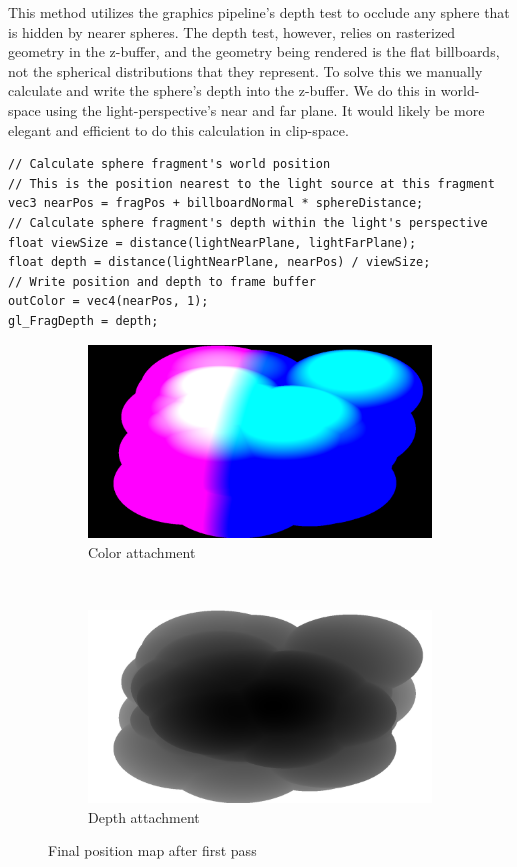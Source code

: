 This method utilizes the graphics pipeline's depth test to occlude any sphere that is hidden by nearer spheres.
The depth test, however, relies on rasterized geometry in the z-buffer, and the geometry being rendered is the flat billboards, not the spherical distributions that they represent. To solve this we manually calculate and write the sphere's depth into the z-buffer. We do this in world-space using the light-perspective's near and far plane. It would likely be more elegant and efficient to do this calculation in clip-space.
\begin{lstlisting}[caption={first\_voxelize.glsl, 60}]
// Calculate sphere fragment's world position 
// This is the position nearest to the light source at this fragment
vec3 nearPos = fragPos + billboardNormal * sphereDistance;
// Calculate sphere fragment's depth within the light's perspective
float viewSize = distance(lightNearPlane, lightFarPlane);
float depth = distance(lightNearPlane, nearPos) / viewSize;
// Write position and depth to frame buffer
outColor = vec4(nearPos, 1);
gl_FragDepth = depth;
\end{lstlisting}

\begin{figure}[h]
\centering
	\begin{subfigure}[t]{0.48\textwidth}
	\includegraphics[width=\textwidth]{../res/positionmapcolor.png}
	\caption{Color attachment}
	\end{subfigure}
	~
	\begin{subfigure}[t]{0.48\textwidth}
	\includegraphics[width=\textwidth]{../res/positionmapdepth.png}
	\caption{Depth attachment}
	\end{subfigure}
\caption{Final position map after first pass}
\end{figure}

